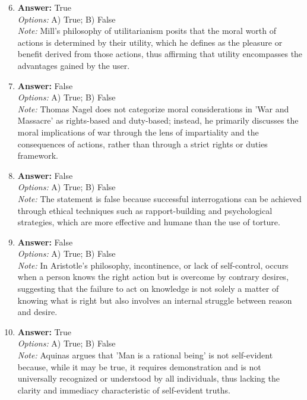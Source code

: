 \documentclass[12pt]{article}
\begin{document}
\begin{enumerate}[label=\arabic*.]
\setcounter{enumi}{5}
\item \textbf{Answer:} True
\\ \textit{Options:} A) True; B) False
\\ \textit{Note:} Mill's philosophy of utilitarianism posits that the moral worth of actions is determined by their utility, which he defines as the pleasure or benefit derived from those actions, thus affirming that utility encompasses the advantages gained by the user.
\item \textbf{Answer:} False
\\ \textit{Options:} A) True; B) False
\\ \textit{Note:} Thomas Nagel does not categorize moral considerations in 'War and Massacre' as rights-based and duty-based; instead, he primarily discusses the moral implications of war through the lens of impartiality and the consequences of actions, rather than through a strict rights or duties framework.
\item \textbf{Answer:} False
\\ \textit{Options:} A) True; B) False
\\ \textit{Note:} The statement is false because successful interrogations can be achieved through ethical techniques such as rapport-building and psychological strategies, which are more effective and humane than the use of torture.
\item \textbf{Answer:} False
\\ \textit{Options:} A) True; B) False
\\ \textit{Note:} In Aristotle's philosophy, incontinence, or lack of self-control, occurs when a person knows the right action but is overcome by contrary desires, suggesting that the failure to act on knowledge is not solely a matter of knowing what is right but also involves an internal struggle between reason and desire.
\item \textbf{Answer:} True
\\ \textit{Options:} A) True; B) False
\\ \textit{Note:} Aquinas argues that 'Man is a rational being' is not self-evident because, while it may be true, it requires demonstration and is not universally recognized or understood by all individuals, thus lacking the clarity and immediacy characteristic of self-evident truths.
\end{enumerate}
\end{document}
